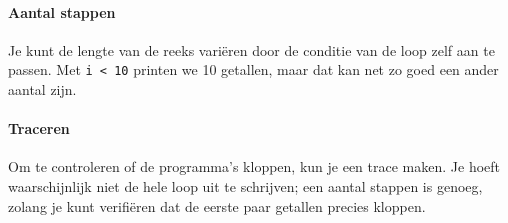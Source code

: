 \paragraph{Aantal stappen}

Je kunt de lengte van de reeks vari\"{e}ren door de conditie van de loop zelf aan te passen. Met \texttt{i < 10} printen we 10 getallen, maar dat kan net zo goed een ander aantal zijn.

\paragraph{Traceren}

Om te controleren of de programma's kloppen, kun je een trace maken. Je hoeft waarschijnlijk niet de hele loop uit te schrijven; een aantal stappen is genoeg, zolang je kunt verifi\"{e}ren dat de eerste paar getallen precies kloppen.

